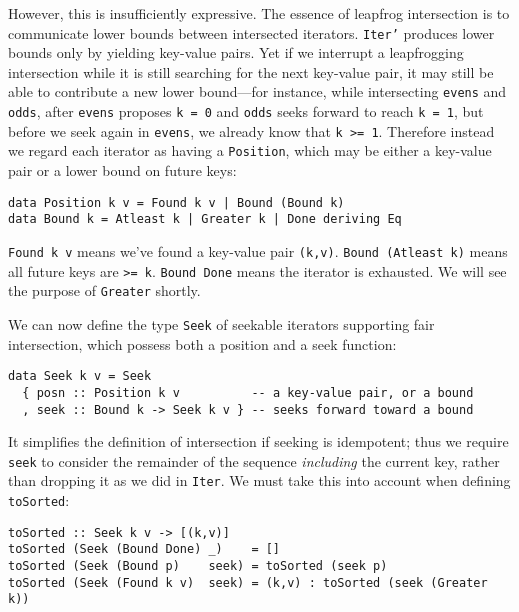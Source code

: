 \documentclass[acmsmall,screen,review,anonymous,dvipsnames,svgnames]{acmart}
\newcommand\hask[1]{\texttt{#1}}
\newcommand\ttt\texttt
\begin{document}
\noindent
However, this is insufficiently expressive.
The essence of leapfrog intersection is to communicate lower bounds between intersected iterators.
\hask{Iter'} produces lower bounds only by yielding key-value pairs.
Yet if we interrupt a leapfrogging intersection while it is still searching for the next key-value pair, it may still be able to contribute a new lower bound---for instance, while intersecting \ttt{evens} and \ttt{odds}, after \ttt{evens} proposes \ttt{k = 0} and \ttt{odds} seeks forward to reach \ttt{k = 1}, but before we seek again in \ttt{evens}, we already know that \ttt{k >= 1}.
%
Therefore instead we regard each iterator as having a \hask{Position}, which may be either a key-value pair or a lower bound on future keys:

\begin{verbatim}
data Position k v = Found k v | Bound (Bound k)
data Bound k = Atleast k | Greater k | Done deriving Eq
\end{verbatim}

\noindent
\hask{Found k v} means we've found a key-value pair \ttt{(k,v)}.
\hask{Bound (Atleast k)} means all future keys are \ttt{>= k}.
\hask{Bound Done} means the iterator is exhausted.
We will see the purpose of \hask{Greater} shortly.

We can now define the type \hask{Seek} of seekable iterators supporting fair intersection, which possess both a position and a seek function:

\begin{verbatim}
data Seek k v = Seek
  { posn :: Position k v          -- a key-value pair, or a bound
  , seek :: Bound k -> Seek k v } -- seeks forward toward a bound
\end{verbatim}

\noindent
It simplifies the definition of intersection if seeking is idempotent; thus we require \ttt{seek} to consider the remainder of the sequence \emph{including} the current key, rather than dropping it as we did in \hask{Iter}.
We must take this into account when defining \ttt{toSorted}:

\begin{verbatim}
toSorted :: Seek k v -> [(k,v)]
toSorted (Seek (Bound Done) _)    = []
toSorted (Seek (Bound p)    seek) = toSorted (seek p)
toSorted (Seek (Found k v)  seek) = (k,v) : toSorted (seek (Greater k))
\end{verbatim}
\end{document}
